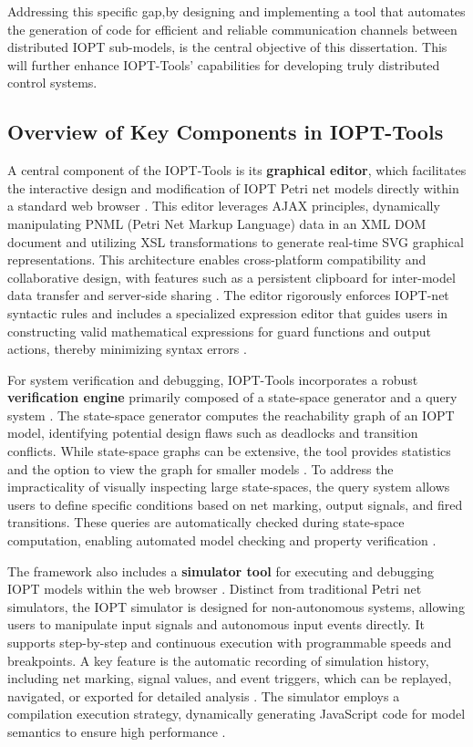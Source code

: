Addressing this specific gap,by designing and implementing a tool that automates the generation of code for efficient and reliable communication channels between distributed IOPT sub-models, is the central objective of this dissertation. This will further enhance IOPT-Tools' capabilities for developing truly distributed control systems.


\subsection{Overview of Key Components in IOPT-Tools}
\label{sub:iopt_tools_components}

A central component of the IOPT-Tools is its \textbf{graphical editor}, which facilitates the interactive design and modification of IOPT Petri net models directly within a standard web browser \cite{apresentacao}. This editor leverages AJAX principles, dynamically manipulating PNML (Petri Net Markup Language) data in an XML DOM document and utilizing XSL transformations to generate real-time SVG graphical representations. This architecture enables cross-platform compatibility and collaborative design, with features such as a persistent clipboard for inter-model data transfer and server-side sharing \cite{apresentacao}. The editor rigorously enforces IOPT-net syntactic rules and includes a specialized expression editor that guides users in constructing valid mathematical expressions for guard functions and output actions, thereby minimizing syntax errors \cite{apresentacao}.

For system verification and debugging, IOPT-Tools incorporates a robust \textbf{verification engine} primarily composed of a state-space generator and a query system \cite{manual, 2015gomes}. The state-space generator computes the reachability graph of an IOPT model, identifying potential design flaws such as deadlocks and transition conflicts. While state-space graphs can be extensive, the tool provides statistics and the option to view the graph for smaller models \cite{vhld}. To address the impracticality of visually inspecting large state-spaces, the query system allows users to define specific conditions based on net marking, output signals, and fired transitions. These queries are automatically checked during state-space computation, enabling automated model checking and property verification \cite{2015gomes}.

The framework also includes a \textbf{simulator tool} for executing and debugging IOPT models within the web browser \cite{2015gomes}. Distinct from traditional Petri net simulators, the IOPT simulator is designed for non-autonomous systems, allowing users to manipulate input signals and autonomous input events directly. It supports step-by-step and continuous execution with programmable speeds and breakpoints. A key feature is the automatic recording of simulation history, including net marking, signal values, and event triggers, which can be replayed, navigated, or exported for detailed analysis \cite{2015gomes}. The simulator employs a compilation execution strategy, dynamically generating JavaScript code for model semantics to ensure high performance \cite{2015gomes}.

